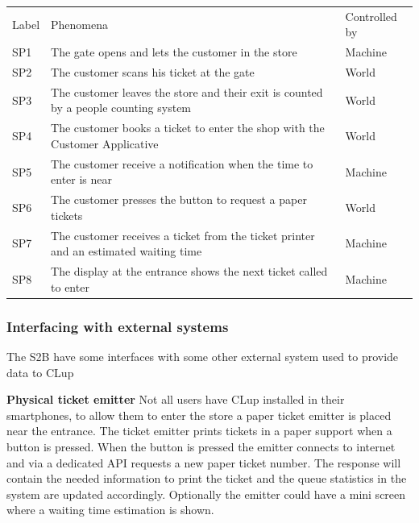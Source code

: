 \renewcommand{\arraystretch}{1.4}
\begin{tabular}{C{1cm}L{10.5cm}C{2.6cm}}
    Label & Phenomena                                                                            & Controlled by \\
    SP1   & The gate opens and lets the customer in the store                                    & Machine       \\
    SP2   & The customer scans his ticket at the gate                                            & World         \\
    SP3   & The customer leaves the store and their exit is counted by a people counting system  & World         \\
    SP4   & The customer books a ticket to enter the shop with the Customer Applicative          & World         \\
    SP5   & The customer receive a notification when the time to enter is near                   & Machine       \\
    SP6   & The customer presses the button to request a paper tickets                           & World         \\
    SP7   & The customer receives a ticket from the ticket printer and an estimated waiting time & Machine       \\
    SP8   & The display at the entrance shows the next ticket called to enter                    & Machine       \\
\end{tabular}

\subsubsection{Interfacing with external systems}
The S2B have some interfaces with some other external system used to provide data to CLup



\textbf{Physical ticket emitter} Not all users have CLup installed in their smartphones, to allow them to enter the store a paper ticket emitter is
placed near the entrance. The ticket emitter prints tickets in
a paper support when a button is pressed. When the button is pressed the emitter connects to internet and via a dedicated API requests a new paper ticket number. The response will contain the needed information to print the ticket and the queue statistics in the system are updated accordingly. Optionally the emitter could have a mini screen where a waiting time estimation is shown.



